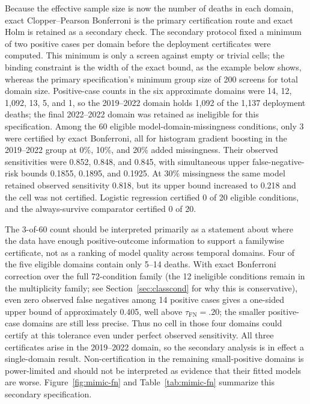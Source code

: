 \documentclass[twoside,11pt]{article}
\begin{document}
Because the effective sample size is now the number of deaths in each domain, exact
Clopper--Pearson Bonferroni is the primary certification route and exact Holm is retained as
a secondary check.
The secondary protocol fixed a minimum of two positive cases per domain before the deployment
certificates were computed. This minimum is only a screen against empty or trivial cells; the
binding constraint is the width of the exact bound, as the example below shows, whereas the
primary specification's minimum group size of 200 screens for total domain size. Positive-case
counts in the six approximate domains were 14, 12, 1,092, 13, 5, and 1, so the 2019--2022
domain holds 1,092 of the 1,137 deployment deaths; the final 2022--2022 domain was retained
as ineligible for this specification. Among the 60 eligible model-domain-missingness conditions,
only 3 were certified by exact Bonferroni, all for histogram gradient boosting in the
2019--2022 group at 0\%, 10\%, and 20\% added missingness. Their observed sensitivities were
0.852, 0.848, and 0.845, with simultaneous upper false-negative-risk bounds 0.1855, 0.1895,
and 0.1925. At 30\% missingness the same model retained observed sensitivity 0.818, but its
upper bound increased to 0.218 and the cell was not certified. Logistic regression certified
0 of 20 eligible conditions, and the always-survive comparator certified 0 of 20.

The 3-of-60 count should be interpreted primarily as a statement about where the data have
enough positive-outcome information to support a familywise certificate, not as a ranking of
model quality across temporal domains. Four of the five eligible domains contain only 5--14
deaths. With exact Bonferroni correction over the full 72-condition family (the 12 ineligible
conditions remain in the multiplicity family; see Section~\ref{sec:classcond} for why this is
conservative), even zero observed false negatives among 14
positive cases gives a one-sided upper bound of approximately 0.405, well above
$\tau_{\mathrm{FN}}=.20$; the smaller positive-case domains are still less precise.
Thus no cell in those four domains could certify at this tolerance even under perfect observed
sensitivity. All three certificates arise in the 2019--2022 domain, so the secondary analysis
is in effect a single-domain result. Non-certification in the remaining small-positive domains
is power-limited and should not be interpreted as evidence that their fitted models are worse.
Figure~\ref{fig:mimic-fn} and Table~\ref{tab:mimic-fn} summarize this secondary specification.
\end{document}
